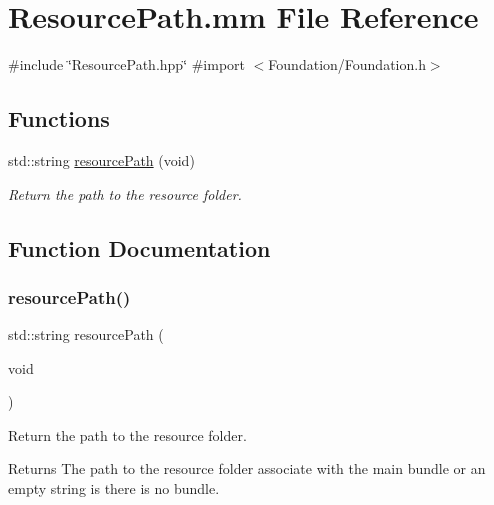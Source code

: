 \hypertarget{ResourcePath_8mm}{}\section{Resource\+Path.\+mm File Reference}
\label{ResourcePath_8mm}
{\ttfamily \#include \char`\"{}Resource\+Path.\+hpp\char`\"{}}\newline
{\ttfamily \#import $<$Foundation/\+Foundation.\+h$>$}\newline
\subsection*{Functions}
\begin{DoxyCompactItemize}
\item 
std\+::string \hyperlink{ResourcePath_8mm_a377b456e3964835648f2d726c2e4f510}{resource\+Path} (void)
\begin{DoxyCompactList}\small\item\em Return the path to the resource folder. \end{DoxyCompactList}\end{DoxyCompactItemize}


\subsection{Function Documentation}
\mbox{\label{ResourcePath_8mm_a377b456e3964835648f2d726c2e4f510}} 
\subsubsection{\texorpdfstring{resource\+Path()}{resourcePath()}}
{\footnotesize\ttfamily std\+::string resource\+Path (\begin{DoxyParamCaption}\item[{void}]{ }\end{DoxyParamCaption})}



Return the path to the resource folder. 

\begin{DoxyReturn}{Returns}
The path to the resource folder associate with the main bundle or an empty string is there is no bundle. 
\end{DoxyReturn}
